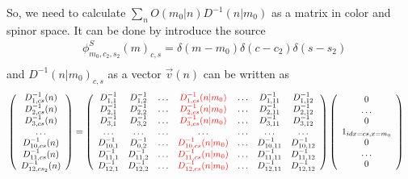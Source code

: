 So, we need to calculate $\sum _n O(m_0|n)D^{-1}(n|m_0)$ as a matrix in color and spinor space. It can be done by introduce the source
\begin{equation}
\begin{split}
&\phi ^{S}_{m_0,c_2,s_2}(m)_{c,s}=\delta (m-m_0)\delta (c-c_2)\delta (s-s_2)\\
\end{split}
\end{equation}
and $D^{-1}(n|m_0)_{c,s}$ as a vector $\vec{v}(n)$ can be written as
\begin{equation}
\begin{split}
&\left(\begin{array}{c} D^{-1}_{1,cs}(n) \\ D^{-1}_{2,cs}(n) \\ D^{-1}_{3,cs}(n) \\ \ldots \\ D^{-1}_{10,cs}(n)\\ D^{-1}_{11,cs}(n) \\ D^{-1}_{12,cs_2}(n)\end{array}\right)=\left(\begin{array}{ccccccc}
D^{-1}_{1,1} & D^{-1}_{1,2} & \ldots & \textcolor[rgb]{1,0,0}{D^{-1}_{1,cs}(n|m_0)} & \ldots &  D^{-1}_{1,11} & D^{-1}_{1,12} \\
D^{-1}_{2,1} & D^{-1}_{2,2} & \ldots & \textcolor[rgb]{1,0,0}{D^{-1}_{2,cs}(n|m_0)} & \ldots &  D^{-1}_{2,11} & D^{-1}_{2,12} \\
D^{-1}_{3,1} & D^{-1}_{3,2} & \ldots & \textcolor[rgb]{1,0,0}{D^{-1}_{3,cs}(n|m_0)} & \ldots &  D^{-1}_{3,11} & D^{-1}_{3,12} \\
\ldots & \ldots & \ldots & \ldots & \ldots &  \ldots & \ldots \\
D^{-1}_{10,1} & D^{-1}_{0,2} & \ldots & \textcolor[rgb]{1,0,0}{D^{-1}_{10,cs}(n|m_0)} & \ldots &  D^{-1}_{10,11} & D^{-1}_{10,12} \\
D^{-1}_{11,1} & D^{-1}_{11,2} & \ldots & \textcolor[rgb]{1,0,0}{D^{-1}_{11,cs}(n|m_0)} & \ldots &  D^{-1}_{11,11} & D^{-1}_{11,12} \\
D^{-1}_{12,1} & D^{-1}_{12,2} & \ldots & \textcolor[rgb]{1,0,0}{D^{-1}_{12,cs}(n|m_0)} & \ldots &  D^{-1}_{12,11} & D^{-1}_{12,12} \\
 \end{array}\right)\left(\begin{array}{c} 0\\ \ldots \\ 0 \\ 1 _{idx=cs,x=m_0}\\ 0 \\ \ldots \\ 0 \end{array}\right)
\end{split}
\end{equation}
